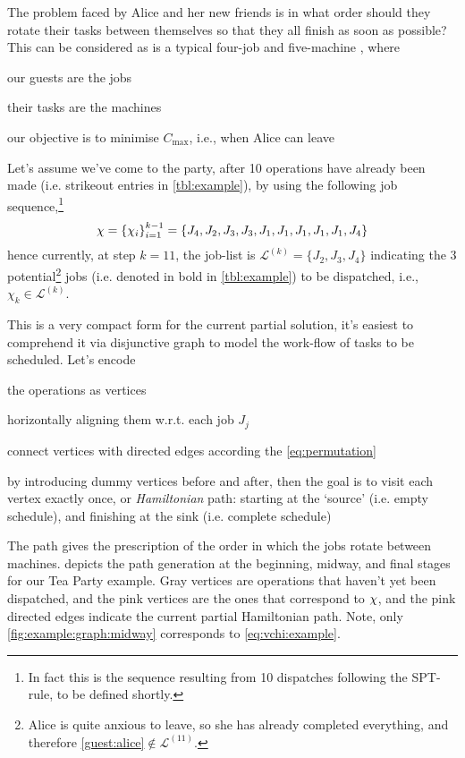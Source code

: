 The problem faced by Alice and her new friends is in what order should they 
rotate their tasks between themselves so that they all finish as soon as 
possible? This can be considered as is a typical four-job and five-machine 
\jsp, where
\begin{enumerate*}[label={{}}]
    \item our guests are the jobs
    \item their tasks are the machines
    \item our objective is to minimise $C_{\max}$, i.e., when Alice can 
    leave
\end{enumerate*}

Let's assume we've come to the party, after 10 operations have already been 
made (i.e. strikeout entries in \cref{tbl:example}), by using the following 
job sequence,\footnote{In fact this is the sequence resulting from 10 
dispatches following the SPT-rule, to be defined shortly.}
\begin{equation}
  \vchi = \left\{ \chi_i \right\}_{i=1}^{k-1} \label{eq:vchi:example}
        = \left\{ J_4,J_2,J_3,J_3,J_1,J_1,J_1,J_1,J_1,J_4 \right\}
\end{equation}
hence currently, at step $k=11$, the job-list is 
$\mathcal{L}^{(k)}=\{J_2,J_3,J_4\}$ indicating the 3 potential\footnote{
  Alice is quite anxious to leave, so she has already completed everything, and 
  therefore \ref{guest:alice}$\notin\mathcal{L}^{(11)}$.} 
jobs (i.e. denoted in bold in \cref{tbl:example}) to be dispatched, i.e., 
$\chi_k\in\mathcal{L}^{(k)}$.



This is a very compact form for the current partial solution, it's easiest to 
comprehend it via disjunctive graph \citep{roy64} to model the work-flow of 
tasks to be scheduled.
Let's encode
\begin{enumerate*}
    \item the operations as vertices
    \item horizontally aligning them w.r.t. each job $J_j$
    \item connect vertices with directed edges according the 
        \cref{eq:permutation}
    \item by introducing dummy vertices before and after, then the goal is to 
    visit each vertex exactly once, or \emph{Hamiltonian} path: starting at the 
    `source'  (i.e. empty schedule), and finishing at the sink (i.e. complete 
    schedule)
\end{enumerate*}
The path gives the prescription of the order in which the jobs rotate 
between machines. 
 depicts the path generation at the beginning, midway, 
and final stages for our Tea Party example. 
Gray vertices are operations that haven't yet been dispatched, and the pink 
vertices are the ones that correspond to ${\mathbf{\chi}}$, 
and the pink directed edges indicate the current partial Hamiltonian path.
Note, only \cref{fig:example:graph:midway} corresponds to 
\cref{eq:vchi:example}.

